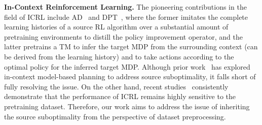 \documentclass{article}
\begin{document}






\textbf{In-Context Reinforcement Learning.}
%
%
The pioneering contributions in the field of ICRL include AD~\cite{laskin2022context} and DPT~\cite{lee2024supervised}, where the former imitates the complete learning histories of a source RL algorithm over a substantial amount of pretraining environments to distill the policy improvement operator, and the latter pretrains a TM to infer the target MDP from the surrounding context (can be derived from the learning history) and to take actions according to the optimal policy for the inferred target MDP.
%
%
%
%
Although prior work~\cite{son2025distilling} has explored in-context model-based planning to address source suboptimality, it falls short of fully resolving the issue. On the other hand, recent studies~\cite{zisman2024emergence, dong2024context, chen2025random} consistently demonstrate that the performance of ICRL remains highly sensitive to the pretraining dataset.
%
Therefore, our work aims to address the issue of inheriting the source suboptimality from the perspective of dataset preprocessing.
\end{document}
